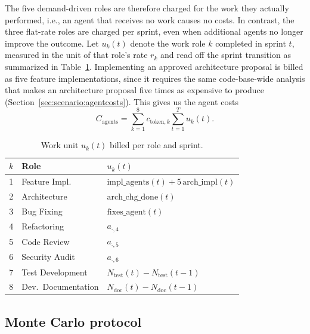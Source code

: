 \documentclass[smallextended]{svjour3}       %
\begin{document}
The five demand-driven roles are therefore charged for the work they actually performed,
i.e., an agent that receives no work causes no costs. In contrast, the three flat-rate roles are
charged per sprint, even when additional agents no longer improve the outcome. Let $u_k(t)$ denote the work role $k$ completed in sprint
$t$, measured in the unit of that role's rate $r_k$ and read off the sprint transition as
summarized in Table~\ref{tab:work_units}. Implementing an approved architecture proposal is
billed as five feature implementations, since it requires the same code-base-wide analysis
that makes an architecture proposal five times as expensive to produce (Section~\ref{sec:scenario:agentcosts}). This gives us the
agent costs
\begin{equation}
  C_\mathrm{agents} = \sum_{k=1}^{8} c_{\mathrm{token},k} \sum_{t=1}^{T} u_k(t).
  \label{eq:cost_agents}
\end{equation}

\begin{table}[t]
\caption{Work unit $u_k(t)$ billed per role and sprint.}
\label{tab:work_units}
\footnotesize
\begin{tabularx}{\linewidth}{cp{2.6cm}X}
\toprule
$k$ & Role & $u_k(t)$ \\
\midrule
1 & Feature Impl.\ & $\mathrm{impl\_agents}(t) + 5\,\mathrm{arch\_impl}(t)$ \\[2pt]
2 & Architecture & $\mathrm{arch\_chg\_done}(t)$ \\[2pt]
3 & Bug Fixing & $\mathrm{fixes\_agent}(t)$ \\[2pt]
4 & Refactoring & $a_{\cdot,4}$ \\[2pt]
5 & Code Review & $a_{\cdot,5}$ \\[2pt]
6 & Security Audit & $a_{\cdot,6}$ \\[2pt]
7 & Test Development & $N_\mathrm{test}(t) - N_\mathrm{test}(t-1)$ \\[2pt]
8 & Dev.\ Documentation & $N_\mathrm{doc}(t) - N_\mathrm{doc}(t-1)$ \\
\bottomrule
\end{tabularx}
\end{table}

\subsection{Monte Carlo protocol}
\label{sec:model:mc}
\end{document}
